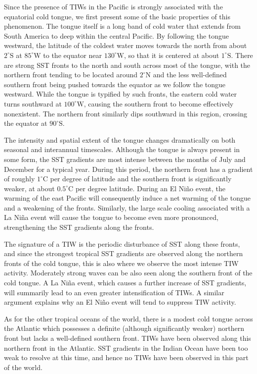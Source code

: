 \documentclass[letterpaper, 11pt, onecolumn]{article}
\newcommand{\degree}{^{\circ}} \newcommand{\abs}[1]{\lvert#1\rvert}
\newcommand{\degC}{\degree\text{C}}
\begin{document}
Since the presence of TIWs in the Pacific is strongly associated with the
equatorial cold tongue, we first present some of the basic properties of this
phenomenon. The tongue itself is a long band of cold water that extends from
South America to deep within the central Pacific. By following the tongue
westward, the latitude of the coldest water moves towards the north from about
$2\degree\text{S}$ at $85\degree\text{W}$ to the equator near
$130\degree\text{W}$, so that it is centered at about $1\degree\text{S}$. There
are strong SST fronts to the north and south across most of the tongue, with
the northern front tending to be located around $2\degree\text{N}$ and the less
well-defined southern front being pushed towards the equator as we follow the
tongue westward. While the tongue is typified by such fronts, the eastern cold
water turns southward at $100\degree\text{W}$, causing the southern front to
become effectively nonexistent. The northern front similarly dips southward in
this region, crossing the equator at $90\degree\text{S}$.

The intensity and spatial extent of the tongue changes dramatically on both
seasonal and interannual timescales. Although the tongue is always present in
some form, the SST gradients are most intense between the months of July and
December for a typical year. During this period, the northern front has a
gradient of roughly $1\degC$ per degree of latitude and the southern front is
significantly weaker, at about $0.5\degC$ per degree latitude. During an El
Ni\~no event, the warming of the east Pacific will consequently induce a net
warming of the tongue and a weakening of the fronts. Similarly, the large scale
cooling associated with a La Ni\~na event will cause the tongue to become even
more pronounced, strengthening the SST gradients along the fronts.

The signature of a TIW is the periodic disturbance of SST along these fronts,
and since the strongest tropical SST gradients are observed along the northern
fronts of the cold tongue, this is also where we observe the most intense TIW
activity. Moderately strong waves can be also seen along the southern front of
the cold tongue. A La Ni\~na event, which causes a further increase of SST
gradients, will summarily lead to an even greater intensification of TIWs. A
similar argument explains why an El Ni\~no event will tend to suppress TIW
activity.

As for the other tropical oceans of the world, there is a modest cold tongue
across the Atlantic which possesses a definite (although significantly weaker)
northern front but lacks a well-defined southern front. TIWs have been observed
along this northern front in the Atlantic. SST gradients in the Indian Ocean
have been too weak to resolve at this time, and hence no TIWs have been
observed in this part of the world.
\end{document}
